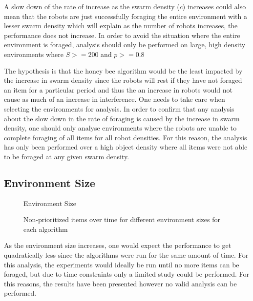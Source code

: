 A slow down of the rate of increase as the swarm density ($c$) increases could also mean that the robots are just successfully foraging the entire environment with a lesser swarm density which will explain as the number of robots increases, the performance does not increase. In order to avoid the situation where the entire environment is foraged, analysis should only be performed on large, high density environments where $S >= 200$ and $p >= 0.8$

The hypothesis is that the honey bee algorithm would be the least impacted by the increase in swarm density since the robots will rest if they have not foraged an item for a particular period and thus the an increase in robots would not cause as much of an increase in interference. One needs to take care when selecting the environments for analysis. In order to confirm that any analysis about the slow down in the rate of foraging is caused by the increase in swarm density, one should only analyse environments where the robots are unable to complete foraging of all items for all robot densities. For this reason, the analysis has only been performed over a high object density where all items were not able to be foraged at any given swarm density.

\subsection{Environment Size}
\label{results:environmentsize}




\begin{figure}[!htb]
\centering
\resizebox{\textwidth}{!}{}
\caption{Environment Size}
\label{sizegoldplot}
\end{figure}

\begin{figure}[!htb]
\centering
\resizebox{\textwidth}{!}{}
\caption{Non-prioritized items over time for different environment sizes for each algorithm}
\label{sizewasteplot}
\end{figure}

As the environment size increases, one would expect the performance to get quadratically less since the algorithms were run for the same amount of time. For this analysis, the experiments would ideally be run until no more items can be foraged, but due to time constraints only a limited study could be performed. For this reasons, the results have been presented however no valid analysis can be performed.

